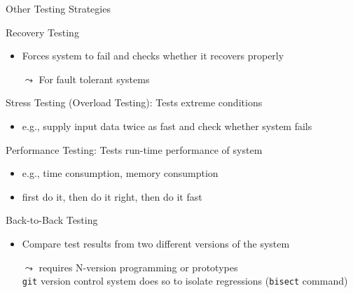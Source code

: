 \begin{frame}{Other Testing Strategies}
  \begin{block}{Recovery Testing}
    \begin{itemize}
    \item Forces system to fail and checks whether it recovers properly
    \item[$\leadsto$] For fault tolerant systems
    \end{itemize}
  \end{block}
  \begin{block}{Stress Testing (Overload Testing): Tests extreme conditions}
    \begin{itemize}
    \item e.g., supply input data twice as fast and check whether system fails
    \end{itemize}
  \end{block}

  \begin{block}{Performance Testing: Tests run-time performance of system}
    \begin{itemize}
    \item e.g., time consumption, memory consumption
    \item first do it, then do it right, then do it fast
    \end{itemize}
  \end{block}

  \begin{block}{Back-to-Back Testing}
    \begin{itemize}
    \item Compare test results from two different versions of the system
    \item[$\leadsto$] requires N-version programming or prototypes\\
      {\small \texttt{git} version control system does so to isolate
        regressions (\texttt{bisect} command)}
    \end{itemize}
  \end{block}
\end{frame}
